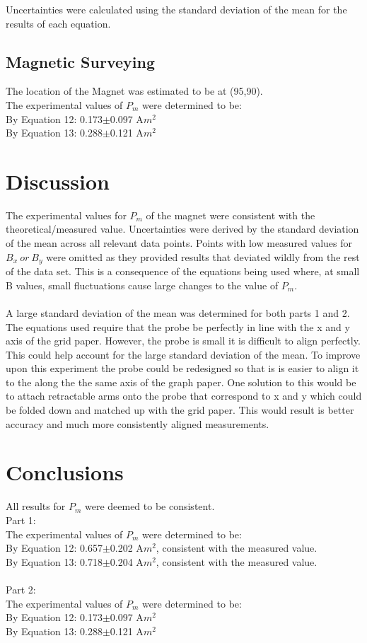 \documentclass{article}
\begin{document}
Uncertainties were calculated using the standard deviation of the mean for the results of each equation.

\subsection{Magnetic Surveying}
The location of the Magnet was estimated to be at (95,90).\\
The experimental values of $P_m$ were determined to be:\\
By Equation 12: 0.173$\pm$0.097 A$m^2$\\
By Equation 13: 0.288$\pm$0.121 A$m^2$
\section{Discussion}
The experimental values for $P_m$ of the magnet were consistent with the theoretical/measured value.
Uncertainties were derived by the standard deviation of the mean across all relevant data points. Points with low measured values for $B_x\ or\ B_y$ were omitted as they provided results that deviated wildly from the rest of the data set. This is a consequence of the equations being used where, at small B values, small fluctuations cause large changes to the value of $P_m$.\\\\
A large standard deviation of the mean was determined for both parts 1 and 2. The equations used require that the probe be perfectly in line with the x and y axis of the grid paper. However, the probe is small it is difficult to align perfectly. This could help account for the large standard deviation of the mean. To improve upon this experiment the probe could be redesigned so that is is easier to align it to the along the the same axis of the graph paper. One solution to this would be to attach retractable arms onto the probe that correspond to x and y which could be folded down and matched up with the grid paper. This would result is better accuracy and much more consistently aligned measurements.

\section{Conclusions}

All results for $P_m$ were deemed to be consistent.\\

Part 1:\\
The experimental values of $P_m$ were determined to be:\\
By Equation 12: 0.657$\pm$0.202 A$m^2$, consistent with the measured value.\\
By Equation 13: 0.718$\pm$0.204 A$m^2$, consistent with the measured value.\\\\
Part 2:\\
The experimental values of $P_m$ were determined to be:\\
By Equation 12: 0.173$\pm$0.097 A$m^2$\\
By Equation 13: 0.288$\pm$0.121 A$m^2$
\end{document}
